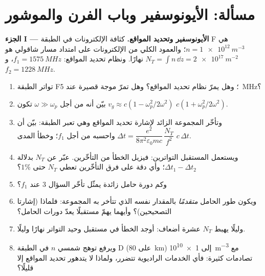 \section{مسألة: الأيونوسفير وباب الفرن والموشور}

\begin{problem}
\label{pb:b2:waves-in-media:1}

\medskip
\noindent\textbf{الجزء I --- الأيونوسفير وتحديد المواقع.}
كثافة الإلكترونات في الطبقة F هي $n = \qty{1e12}{m^{-3}}$؛ والعمود الكلي من
الإلكترونات على امتداد مسار شاقولي هو $N_T = \int n\,\dd z = \qty{2e17}{m^{-2}}$
نهارًا. ونظام تحديد المواقع: $f_1 = \qty{1575}{MHz}$، و $f_2 = \qty{1228}{MHz}$.
\begin{enumerate}
  \item تواتر  الطبقة F؛ وهل يمرّ نظام تحديد المواقع؟ وهل تمرّ
        موجة قصيرة عند \qty{5}{MHz}؟
  \item بيّن أنه من أجل $\omega \gg \omega_p$ تكون  $v_g \approx c(1 -
        \omega_p^2/2\omega^2)$  $c(1 + \omega_p^2/2\omega^2)$.
  \item وتأخّر المجموعة الزائد لإشارة تحديد المواقع وهي تعبر الطبقة: بيّن
        أن $\Delta t = \dfrac{e^2}{8\pi^2\varepsilon_0mc}\,\dfrac{N_T}{f^2}$ واحسبه من أجل
        $f_1$؛ وخطأ المدى $c\,\Delta t$.
  \item ويستعمل المستقبل التواترين: فيزيل الخطأ من التأخّرين.
        عبّر عن $N_T$ بدلالة $\Delta t_1 - \Delta t_2$؛
        وأي دقة على فرق التأخّرين تعطي $N_T$ حتى $1\%$؟
  \item وكم دورة حامل زائدة يمثّل تأخّر السؤال 3
        عند $f_1$؟
  \item ويكون طور الحامل \emph{متقدمًا} بالمقدار نفسه الذي
        تتأخر به المجموعة: فلماذا (إشارتا التصحيحين)؟ وأيهما
        يهمّ مستقبلًا يعدّ دورات الحامل؟
  \item وليلًا يهبط $N_T$ عشرة أضعاف: أوجد الخطأ في مستقبل
        وحيد التواتر نهارًا وليلًا.
  \item ويرفع توهج شمسي $n$ في الطبقة D (على \qty{80}{km}) إلى
        \qty{1e10}{m^{-3}} مع تصادمات كثيرة: فأي الخدمات الراديوية
        تتضرر، ولماذا لا يتدهور تحديد المواقع إلا قليلًا؟
\end{enumerate}


\end{problem}
